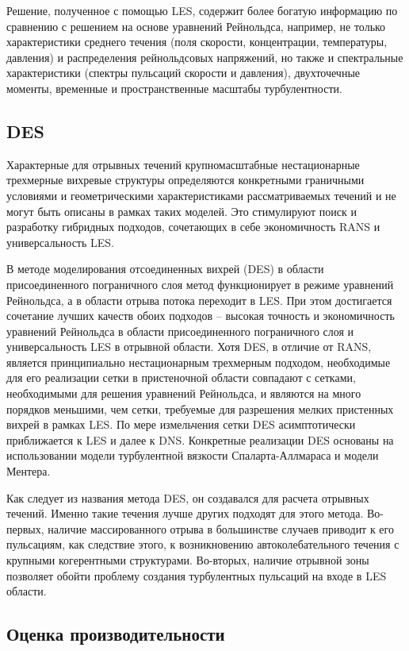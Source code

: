 	Решение, полученное с помощью LES, содержит более богатую информацию по сравнению с решением на основе уравнений Рейнольдса, например, не только характеристики среднего течения (поля скорости, концентрации, температуры, давления) и распределения рейнольдсовых напряжений, но также и спектральные характеристики (спектры пульсаций скорости и давления), двухточечные моменты, временные и пространственные масштабы турбулентности.

\subsection{DES}
	
	Характерные для отрывных течений крупномасштабные нестационарные трехмерные вихревые структуры определяются конкретными граничными условиями и геометрическими характеристиками рассматриваемых течений и не могут быть описаны в рамках таких моделей. Это стимулируют поиск и разработку гибридных подходов, сочетающих в себе экономичность RANS и универсальность LES.
	
	В методе моделирования отсоединенных вихрей (DES) в области присоединенного пограничного слоя метод функционирует в режиме уравнений Рейнольдса, а в области отрыва потока переходит в LES. При этом достигается сочетание лучших качеств обоих подходов -- высокая точность и экономичность уравнений Рейнольдса в области присоединенного пограничного слоя и универсальность LES в отрывной области. Хотя DES, в отличие от RANS, является принципиально нестационарным трехмерным подходом, необходимые для его реализации сетки в пристеночной области совпадают с сетками, необходимыми для решения уравнений Рейнольдса, и являются на много порядков меньшими, чем сетки, требуемые для разрешения мелких пристенных вихрей в рамках LES. По мере измельчения сетки DES асимптотически приближается к LES и далее к DNS. Конкретные реализации DES основаны на использовании модели турбулентной вязкости Спаларта-Аллмараса и модели Ментера\cite{Strelets2001}.
	
	Как следует из названия метода DES, он создавался для расчета отрывных течений. Именно такие течения лучше других подходят для этого метода. Во-первых, наличие массированного отрыва в большинстве случаев приводит к его пульсациям, как следствие этого, к возникновению автоколебательного течения с крупными когерентными структурами. Во-вторых, наличие отрывной зоны позволяет обойти проблему создания турбулентных пульсаций на входе в LES области.

\subsection{Оценка производительности}
	
